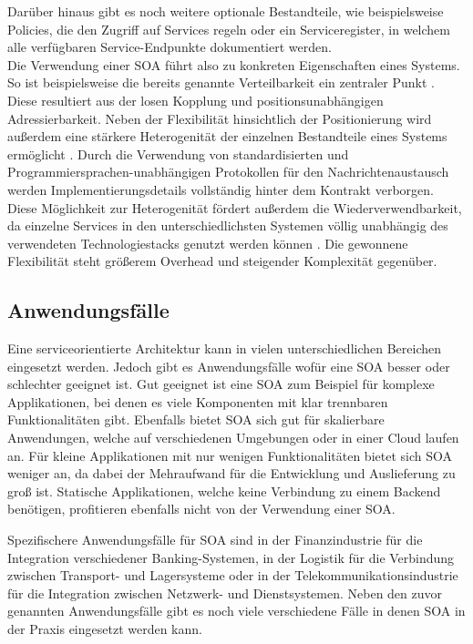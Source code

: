 Darüber hinaus gibt es noch weitere optionale Bestandteile, wie beispielsweise Policies, die den Zugriff auf Services regeln oder ein Serviceregister, in welchem alle verfügbaren Service-Endpunkte dokumentiert werden.\\
Die Verwendung einer SOA führt also zu konkreten Eigenschaften eines Systems. So ist beispielsweise die bereits genannte Verteilbarkeit ein zentraler Punkt \cite{ADNANGOHAR.2010}. Diese resultiert aus der losen Kopplung und positionsunabhängigen Adressierbarkeit. Neben der Flexibilität hinsichtlich der Positionierung wird außerdem eine stärkere Heterogenität der einzelnen Bestandteile eines Systems ermöglicht \cite{SANDERS.2008}. Durch die Verwendung von standardisierten und Programmiersprachen-unabhängigen Protokollen für den Nachrichtenaustausch werden Implementierungsdetails vollständig hinter dem Kontrakt verborgen. Diese Möglichkeit zur Heterogenität fördert außerdem die Wiederverwendbarkeit, da einzelne Services in den unterschiedlichsten Systemen völlig unabhängig des verwendeten Technologiestacks genutzt werden können \cite{ADNANGOHAR.2010}. Die gewonnene Flexibilität steht größerem Overhead und steigender Komplexität gegenüber.


\subsection{Anwendungsfälle}
\label{sec:useCasesSoa}
Eine serviceorientierte Architektur kann in vielen unterschiedlichen Bereichen eingesetzt werden. Jedoch gibt es Anwendungsfälle wofür eine SOA besser oder schlechter geeignet ist. Gut geeignet ist eine SOA zum Beispiel für komplexe Applikationen, bei denen es viele Komponenten mit klar trennbaren Funktionalitäten gibt. Ebenfalls bietet SOA sich gut für skalierbare Anwendungen, welche auf verschiedenen Umgebungen oder in einer Cloud laufen an. Für kleine Applikationen mit nur wenigen Funktionalitäten bietet sich SOA weniger an, da dabei der Mehraufwand für die Entwicklung und Auslieferung zu groß ist. Statische Applikationen, welche keine Verbindung zu einem Backend benötigen, profitieren ebenfalls nicht von der Verwendung einer SOA.    

Spezifischere Anwendungsfälle für SOA sind in der Finanzindustrie für die Integration verschiedener Banking-Systemen, in der Logistik für die Verbindung zwischen Transport- und Lagersysteme oder in der Telekommunikationsindustrie für die Integration zwischen Netzwerk- und Dienstsystemen. Neben den zuvor genannten Anwendungsfälle gibt es noch viele verschiedene Fälle in denen SOA in der Praxis eingesetzt werden kann. \cite{Heutschi.2007}
